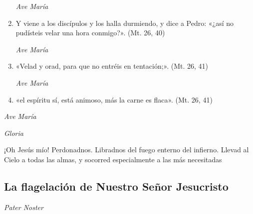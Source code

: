 \documentclass[a4paper,11pt, oneside]{report}
\begin{document}
\begin{enumerate}
          \textit{Ave María}

          \item Y viene a los discípulos y los halla durmiendo, y dice a Pedro: «¿así no pudísteis velar una hora conmigo?». (Mt. 26, 40)

          \textit{Ave María}

          \item «Velad y orad, para que no entréis en tentación;». (Mt. 26, 41)

          \textit{Ave María}

          \item «el espíritu sí, está animoso, más la carne es flaca». (Mt. 26, 41)

        \end{enumerate}

        \textit{Ave María} \par
        \indent\textit{Gloria} \par
        \indent¡Oh Jesús mío! Perdonadnos. Libradnos del fuego enterno del infierno. Llevad al Cielo a todas las almas, y socorred especialmente a las más 
        necesitadas

      \subsection*{La flagelación de Nuestro Señor Jesucristo}
      
        \textit{Pater Noster}
\end{document}
